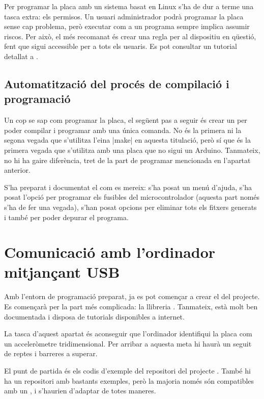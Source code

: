 Per programar la placa amb un sistema basat en Linux s'ha de dur a terme una
tasca extra: els permisos. Un usuari administrador podrà programar la placa
sense cap problema, però executar com a  un programa sempre implica
assumir riscos. Per això, el més recomanat és crear una regla 
per al dispositiu en qüestió, fent que sigui accessible per a tots els usuaris.
Es pot consultar un tutorial detallat a \cite{CreateUdevRules}.

\subsection{Automatització del procés de compilació i programació}

Un cop se sap com programar la placa, el següent pas a seguir és crear un
 per poder compilar i programar amb una única comanda.
No és la primera ni la segona vegada que s'utilitza l'eina \ord|make| en
aquesta titulació, però sí que és la primera vegada que s'utilitza amb una placa
que no sigui un Arduino. Tanmateix, no hi ha gaire diferència, tret de la
part de programar mencionada en l'apartat anterior.

S'ha preparat i documentat el  com es mereix: s'ha posat un menú
d'ajuda, s'ha posat l'opció per programar els fusibles del microcontrolador
(aquesta part només s'ha de fer una vegada), s'han posat opcions per
eliminar tots els fitxers generats i també per poder depurar el programa.

\section{Comunicació amb l'ordinador mitjançant USB}

Amb l'entorn de programació preparat, ja es pot començar a crear el
 del projecte. Es començarà per la part més complicada: la
llibreria . Tanmateix, està molt ben documentada i disposa de
tutorials disponibles a internet.

La tasca d'aquest apartat és aconseguir que l'ordinador identifiqui la placa
com un acceleròmetre tridimensional. Per arribar a aquesta meta hi haurà un
seguit de reptes i barreres a superar.

El punt de partida és els codis d'exemple del repositori del projecte
\cite{VusbProjects}.
També hi ha un repositori amb bastants exemples, però la majoria només són
compatibles amb un , i s'haurien d'adaptar de totes maneres.

